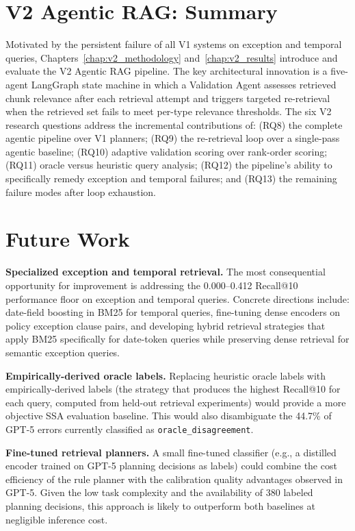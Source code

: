 \section{V2 Agentic RAG: Summary}
\label{sec:conc_v2_summary}

Motivated by the persistent failure of all V1 systems on exception and temporal queries, Chapters~\ref{chap:v2_methodology} and~\ref{chap:v2_results} introduce and evaluate the V2 Agentic RAG pipeline. The key architectural innovation is a five-agent LangGraph state machine in which a Validation Agent assesses retrieved chunk relevance after each retrieval attempt and triggers targeted re-retrieval when the retrieved set fails to meet per-type relevance thresholds. The six V2 research questions address the incremental contributions of: (RQ8) the complete agentic pipeline over V1 planners; (RQ9) the re-retrieval loop over a single-pass agentic baseline; (RQ10) adaptive validation scoring over rank-order scoring; (RQ11) oracle versus heuristic query analysis; (RQ12) the pipeline's ability to specifically remedy exception and temporal failures; and (RQ13) the remaining failure modes after loop exhaustion.

\section{Future Work}
\label{sec:conc_future}

\textbf{Specialized exception and temporal retrieval.} The most consequential opportunity for improvement is addressing the 0.000--0.412 Recall@10 performance floor on exception and temporal queries. Concrete directions include: date-field boosting in BM25 for temporal queries, fine-tuning dense encoders on policy exception clause pairs, and developing hybrid retrieval strategies that apply BM25 specifically for date-token queries while preserving dense retrieval for semantic exception queries.

\textbf{Empirically-derived oracle labels.} Replacing heuristic oracle labels with empirically-derived labels (the strategy that produces the highest Recall@10 for each query, computed from held-out retrieval experiments) would provide a more objective SSA evaluation baseline. This would also disambiguate the 44.7\% of GPT-5 errors currently classified as \texttt{oracle\_disagreement}.

\textbf{Fine-tuned retrieval planners.} A small fine-tuned classifier (e.g., a distilled encoder trained on GPT-5 planning decisions as labels) could combine the cost efficiency of the rule planner with the calibration quality advantages observed in GPT-5. Given the low task complexity and the availability of 380 labeled planning decisions, this approach is likely to outperform both baselines at negligible inference cost.

